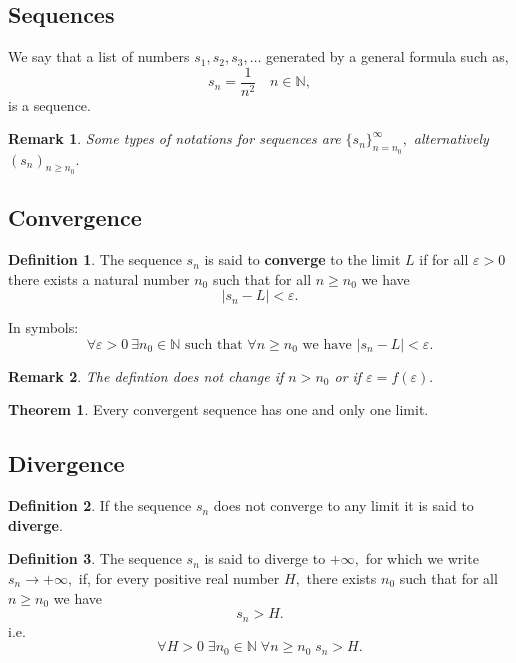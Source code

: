 \documentclass[12pt, a4paper]{article}
\newcommand{\bb}[1]{\mathbb{#1}}
\newcommand{\f}[2]{\frac{#1}{#2}}
\newtheorem*{remark}{Remark}
\theoremstyle{definition}
\newtheorem{definition}{Definition}[section]
\newtheorem{theorem}{Theorem}[section]
\theoremstyle{plain}
\begin{document}
\subsection{Sequences}

We say that a list of numbers $s_1,s_2,s_3,\ldots$ generated by a general formula such as, $$s_n=\f{1}{n^2} \quad n\in\bb{N},$$ is a sequence.

\begin{remark}
Some types of notations for sequences are $\{s_n\}_{n=n_0}^{\infty},$ alternatively $(s_n)_{n\geq n_0}.$
\end{remark}

\subsection{Convergence}

\begin{definition}
The sequence $s_n$ is said to \textbf{converge} to the limit $L$ if for all $\varepsilon > 0$ there exists a natural number $n_0$ such that for all $n\geq n_0$ we have $$|s_n-L|<\varepsilon.$$
\end{definition}

\begin{tcolorbox}
In symbols:
$$\forall \varepsilon >0 \: \exists n_0 \in \bb{N} \text{ such that } \forall n\geq n_0 \text{ we have } |s_n-L|<\varepsilon.$$
\end{tcolorbox}

\begin{remark}
The defintion does not change if $n>n_0$ or if $\varepsilon = f(\varepsilon).$
\end{remark}

\begin{theorem}
Every convergent sequence has one and only one limit.
\end{theorem}

\subsection{Divergence}

\begin{definition}
If the sequence $s_n$ does not converge to any limit it is said to \textbf{diverge}.
\end{definition}

\begin{definition}
The sequence $s_n$ is said to diverge to $+\infty,$ for which we write $s_n\to +\infty,$ if, for every positive real number $H,$ there exists $n_0$ such that for all $n\geq n_0$ we have $$s_n>H.$$ i.e. $$\forall H>0 \; \exists n_0 \in \bb{N} \; \forall n\geq n_0 \; s_n>H.$$
\end{definition}
\end{document}
